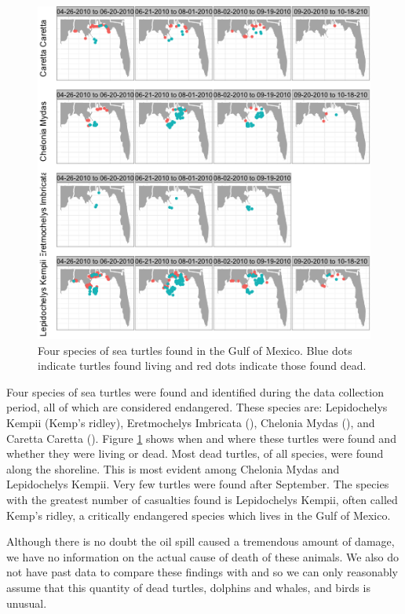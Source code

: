 \documentclass[11pt]{article}
\begin{document}
\begin{figure}[htbp] %
   \centering
   \includegraphics[width=5in]{turtles.png} 
   \caption{Four species of sea turtles found in the Gulf of Mexico.  Blue dots indicate turtles found living and red dots indicate those found dead.}
   \label{turtles}
\end{figure}

Four species of sea turtles were found and identified during the data collection period, all of which are considered endangered.  These species are: Lepidochelys Kempii (Kemp's ridley), Eretmochelys Imbricata (), Chelonia Mydas (), and Caretta Caretta (). Figure \ref{turtles} shows when and where these turtles were found and whether they were living or dead. Most dead turtles, of all species, were found along the shoreline. This is most evident among Chelonia Mydas and Lepidochelys Kempii.  Very few turtles were found after September. The species with the greatest number of casualties found is Lepidochelys Kempii, often called Kemp's ridley, a critically endangered species which lives in the Gulf of Mexico. 

Although there is no doubt the oil spill caused a tremendous amount of damage, we have no information on the actual cause of death of these animals.  We also do not have past data to compare these findings with and so we can only reasonably assume that this quantity of dead turtles, dolphins and whales, and birds is unusual.  
\end{document}

